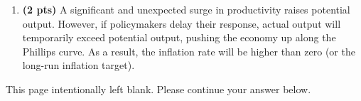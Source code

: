 \documentclass[14pt, oneside]{memoir}
\begin{document}
\begin{enumerate}[label=\textbf{\arabic*.}, itemsep=15pt]
\begin{enumerate}[label=(\alph*)]
	*Any other plausible factor should be considered a valid answer.
	
	\bigskip
		
	\clearpage
	\item \textbf{(2 pts)} 	
		A significant and unexpected surge in productivity raises potential output. However, if policymakers delay their response, actual output will temporarily exceed potential output, pushing the economy up along the Phillips curve. As a result, the inflation rate will be higher than zero (or the long-run inflation target).
\end{enumerate}



\newpage
\begin{center}
	This page intentionally left blank. Please continue your answer below.
\end{center}
\vspace*{\fill}
%
\vspace*{\fill}

\end{enumerate}
  
\end{document}
